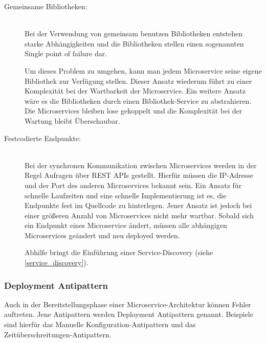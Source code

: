 \begin{description}
    \item[Gemeinsame Bibliotheken:]\hfill \\
    Bei der Verwendung von gemeinsam benutzen Bibliotheken entstehen starke Abhängigkeiten und die Bibliotheken stellen einen sogenannten \glqq Single point of failure\grqq{} dar.

    Um dieses Problem zu umgehen, kann man jedem Microservice seine eigene Bibliothek zur Verfügung stellen. Dieser Ansatz wiederum führt zu einer Komplexität bei der Wartbarkeit der Microservice. Ein weitere Ansatz wäre es die Bibliotheken durch einen Bibliothek-Service zu abstrahieren. Die Microservices bleiben lose gekoppelt und die Komplexität bei der Wartung bleibt Überschaubar.
    
    \item[Festcodierte Endpunkte:]\hfill \\
    Bei der synchronen Kommunikation zwischen Microservices werden in der Regel Anfragen über REST APIs gestellt. Hierfür müssen die IP-Adresse und der Port des anderen Microservices bekannt sein. Ein Ansatz für schnelle Laufzeiten und eine schnelle Implementierung ist es, die Endpunkte fest im Quellcode zu hinterlegen. Jener Ansatz ist jedoch bei einer größeren Anzahl von Microservices nicht mehr wartbar. Sobald sich ein Endpunkt eines Microservice ändert, müssen alle abhängigen Microservices geändert und neu deployed werden.

    Abhilfe bringt die Einführung einer Service-Discovery (siehe \autoref{service_discovery}).

\end{description}

\subsubsection*{Deployment Antipattern}

Auch in der Bereitstellungsphase einer Microservice-Architektur können Fehler auftreten. Jene Antipattern werden Deployment Antipattern genannt. Beispiele sind hierfür das \glqq Manuelle Konfiguration\grqq{}-Antipattern und das \glqq Zeitüberschreitungen\grqq{}-Antipattern.

